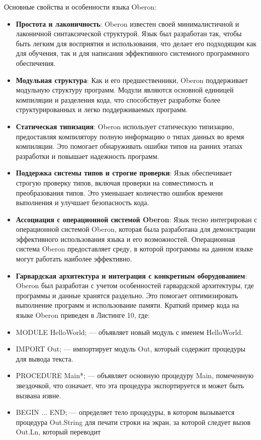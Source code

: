 Основные свойства и особенности языка Oberon:
\begin{itemize}[label = ---]
    \item \textbf{Простота и лаконичность}: Oberon известен своей минималистичной и лаконичной синтаксической структурой. Язык был разработан так, чтобы быть легким для восприятия и использования, что делает его подходящим как для обучения, так и для написания эффективного системного программного обеспечения.
    \item \textbf{Модульная структура}: Как и его предшественники, Oberon поддерживает модульную структуру программ. Модули являются основной единицей компиляции и разделения кода, что способствует разработке более структурированных и легко поддерживаемых программ.
    \item \textbf{Статическая типизация}: Oberon использует статическую типизацию, предоставляя компилятору полную информацию о типах данных во время компиляции. Это помогает обнаруживать ошибки типов на ранних этапах разработки и повышает надежность программ.
    \item \textbf{Поддержка системы типов и строгие проверки}: Язык обеспечивает строгую проверку типов, включая проверки на совместимость и преобразования типов. Это уменьшает количество ошибок времени выполнения и улучшает безопасность кода.
    \item \textbf{Ассоциация с операционной системой Oberon}: Язык тесно интегрирован с операционной системой Oberon, которая была разработана для демонстрации эффективного использования языка и его возможностей. Операционная система Oberon предоставляет среду, в которой программы на данном языке могут работать наиболее эффективно.
    \item \textbf{Гарвардская архитектура и интеграция с конкретным оборудованием}: Oberon был разработан с учетом особенностей гарвардской архитектуры, где программы и данные хранятся раздельно. Это помогает оптимизировать выполнение программ и использование памяти. Краткий пример кода на языке Oberon приведен в Листинге 10, где:
    \item MODULE HelloWorld; --- объявляет новый модуль с именем HelloWorld.
    \item IMPORT Out; --- импортирует модуль Out, который содержит процедуры для вывода текста.
    \item PROCEDURE Main*; --- объявляет основную процедуру Main, помеченную звездочкой, что означает, что эта процедура экспортируется и может быть вызвана извне.
    \item BEGIN ... END; --- определяет тело процедуры, в котором вызывается процедура Out.String для печати строки на экран, за которой следует вызов Out.Ln, который переводит
\end{itemize}

